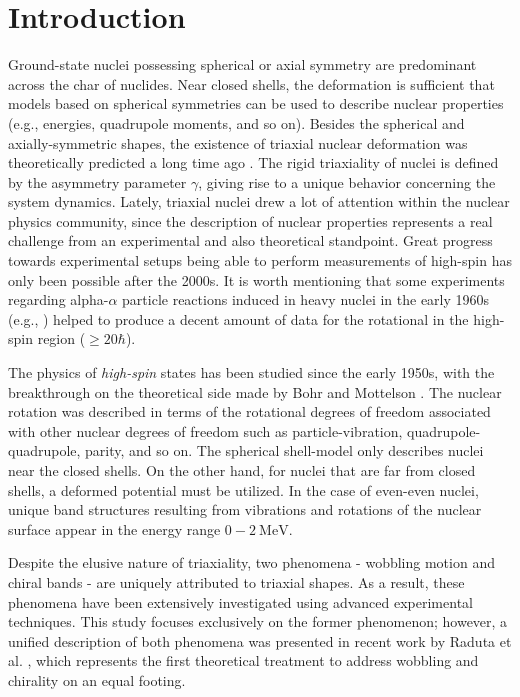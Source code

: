 \chapter{Introduction}

Ground-state nuclei possessing spherical or axial symmetry are predominant across the char of nuclides. Near closed shells, the deformation is sufficient that models based on spherical symmetries can be used to describe nuclear properties (e.g., energies, quadrupole moments, and so on). Besides the spherical and axially-symmetric shapes, the existence of triaxial nuclear deformation was theoretically predicted a long time ago \cite{bohr1998nuclear}. The rigid triaxiality of nuclei is defined by the asymmetry parameter $\gamma$, giving rise to a unique behavior concerning the system dynamics. Lately, triaxial nuclei drew a lot of attention within the nuclear physics community, since the description of nuclear properties represents a real challenge from an experimental and also theoretical standpoint. Great progress towards experimental setups being able to perform measurements of high-spin has only been possible after the 2000s. It is worth mentioning that some experiments regarding alpha-$\alpha$ particle reactions induced in heavy nuclei in the early 1960s (e.g., \cite{morinaga1963gamma}) helped to produce a decent amount of data for the rotational in the high-spin region ($\geq 20 \hbar$).

The physics of \emph{high-spin} states has been studied since the early 1950s, with the breakthrough on the theoretical side made by Bohr and Mottelson \cite{bohr1998nuclear}. The nuclear rotation was described in terms of the rotational degrees of freedom associated with other nuclear degrees of freedom such as particle-vibration, quadrupole-quadrupole, parity, and so on. The spherical shell-model only describes nuclei near the closed shells. On the other hand, for nuclei that are far from closed shells, a deformed potential must be utilized. In the case of even-even nuclei, unique band structures resulting from vibrations and rotations of the nuclear surface appear in the energy range $0-2\ \text{MeV}$.

Despite the elusive nature of triaxiality, two phenomena - wobbling motion and chiral bands - are uniquely attributed to triaxial shapes. As a result, these phenomena have been extensively investigated using advanced experimental techniques. This study focuses exclusively on the former phenomenon; however, a unified description of both phenomena was presented in recent work by Raduta et al. \cite{raduta2022simultaneous}, which represents the first theoretical treatment to address wobbling and chirality on an equal footing.

